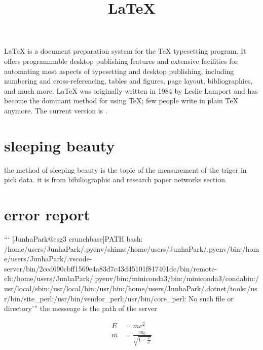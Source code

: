 \documentclass[12pt]{article}
\title{\LaTeX}
\date{}
\begin{document}
  \maketitle
  \LaTeX{} is a document preparation system for the \TeX{}
  typesetting program. It offers programmable desktop publishing
  features and extensive facilities for automating most aspects of
  typesetting and desktop publishing, including numbering and
  cross-referencing, tables and figures, page layout, bibliographies,
  and much more. \LaTeX{} was originally written in 1984 by Leslie
  Lamport and has become the dominant method for using \TeX; few
  people write in plain \TeX{} anymore. The current version  is
  \LaTeXe.

\section{sleeping beauty}
the method of sleeping beauty is the topic of the measurement of the triger in pick data. it is from bibiliographic and research paper networks section.

  \section*{error report }

```
[JunhaPark@csg3 crunchbase]$ $PATH
bash: /home/users/JunhaPark/.pyenv/shims:/home/users/JunhaPark/.pyenv/bin:/home/users/JunhaPark/.vscode-server/bin/2ccd690cbff1569e4a83d7c43d45101f817401dc/bin/remote-cli:/home/users/JunhaPark/.pyenv/bin:/miniconda3/bin:/miniconda3/condabin:/usr/local/sbin:/usr/local/bin:/usr/bin:/home/users/JunhaPark/.dotnet/tools:/usr/bin/site_perl:/usr/bin/vendor_perl:/usr/bin/core_perl: No such file or directory'''
 the messeage is the path of the server

  \begin{align}
    E &= mc^2                              \\
    m &= \frac{m_0}{\sqrt{1-\frac{v^2}{c^2}}}
  \end{align}
\end{document}
